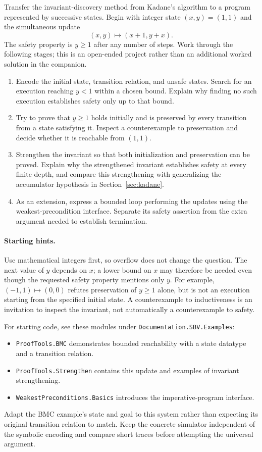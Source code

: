 \documentclass[review]{jfp-epi}
\newcommand{\code}[1]{\texttt{#1}}
\begin{document}
Transfer the invariant-discovery method from Kadane's algorithm to a program
represented by successive states. Begin with integer state $(x,y)=(1,1)$ and
the simultaneous update
\[
 (x,y)\longmapsto(x+1,y+x).
\]
The safety property is $y\geq1$ after any number of steps. Work through the
following stages; this is an open-ended project rather than an additional
worked solution in the companion.
\begin{enumerate}
\item Encode the initial state, transition relation, and unsafe states. Search
  for an execution reaching $y<1$ within a chosen bound. Explain why finding no
  such execution establishes safety only up to that bound.
\item Try to prove that $y\geq1$ holds initially and is preserved by every
  transition from a state satisfying it. Inspect a counterexample to preservation
  and decide whether it is reachable from $(1,1)$.
\item Strengthen the invariant so that both initialization and preservation can
  be proved. Explain why the strengthened invariant establishes safety at every
  finite depth, and compare this strengthening with generalizing the accumulator
  hypothesis in Section~\ref{sec:kadane}.
\item As an extension, express a bounded loop performing the updates using the
  weakest-precondition interface. Separate its safety assertion from the extra
  argument needed to establish termination.
\end{enumerate}

\paragraph{Starting hints.}
Use mathematical integers first, so overflow does not change the question.
The next value of $y$ depends on $x$; a lower bound on $x$ may therefore be
needed even though the requested safety property mentions only $y$.
For example, $(-1,1)\longmapsto(0,0)$ refutes preservation of $y\geq1$ alone,
but is not an execution starting from the specified initial state. A
counterexample to inductiveness is an invitation to inspect the invariant,
not automatically a counterexample to safety.

For starting code, see these modules under
\code{Documentation.\allowbreak SBV.\allowbreak Examples}:
\begin{itemize}
\item \code{ProofTools.\allowbreak BMC} demonstrates bounded reachability with
  a state datatype and a transition relation.
\item \code{ProofTools.\allowbreak Strengthen} contains this update and
  examples of invariant strengthening.
\item \code{WeakestPreconditions.\allowbreak Basics} introduces the
  imperative-program interface.
\end{itemize}
Adapt the BMC example's state and
goal to this system rather than expecting its original transition relation to
match. Keep the concrete simulator independent of the symbolic encoding and
compare short traces before attempting the universal argument.
\end{document}

